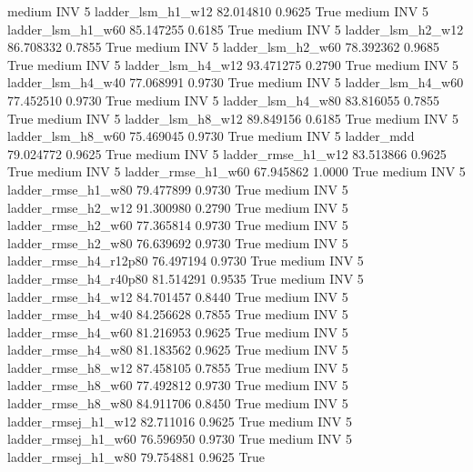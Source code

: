     medium      INV                 5      ladder_lsm_h1_w12  82.014810      0.9625    True
    medium      INV                 5      ladder_lsm_h1_w60  85.147255      0.6185    True
    medium      INV                 5      ladder_lsm_h2_w12  86.708332      0.7855    True
    medium      INV                 5      ladder_lsm_h2_w60  78.392362      0.9685    True
    medium      INV                 5      ladder_lsm_h4_w12  93.471275      0.2790    True
    medium      INV                 5      ladder_lsm_h4_w40  77.068991      0.9730    True
    medium      INV                 5      ladder_lsm_h4_w60  77.452510      0.9730    True
    medium      INV                 5      ladder_lsm_h4_w80  83.816055      0.7855    True
    medium      INV                 5      ladder_lsm_h8_w12  89.849156      0.6185    True
    medium      INV                 5      ladder_lsm_h8_w60  75.469045      0.9730    True
    medium      INV                 5             ladder_mdd  79.024772      0.9625    True
    medium      INV                 5     ladder_rmse_h1_w12  83.513866      0.9625    True
    medium      INV                 5     ladder_rmse_h1_w60  67.945862      1.0000    True
    medium      INV                 5     ladder_rmse_h1_w80  79.477899      0.9730    True
    medium      INV                 5     ladder_rmse_h2_w12  91.300980      0.2790    True
    medium      INV                 5     ladder_rmse_h2_w60  77.365814      0.9730    True
    medium      INV                 5     ladder_rmse_h2_w80  76.639692      0.9730    True
    medium      INV                 5  ladder_rmse_h4_r12p80  76.497194      0.9730    True
    medium      INV                 5  ladder_rmse_h4_r40p80  81.514291      0.9535    True
    medium      INV                 5     ladder_rmse_h4_w12  84.701457      0.8440    True
    medium      INV                 5     ladder_rmse_h4_w40  84.256628      0.7855    True
    medium      INV                 5     ladder_rmse_h4_w60  81.216953      0.9625    True
    medium      INV                 5     ladder_rmse_h4_w80  81.183562      0.9625    True
    medium      INV                 5     ladder_rmse_h8_w12  87.458105      0.7855    True
    medium      INV                 5     ladder_rmse_h8_w60  77.492812      0.9730    True
    medium      INV                 5     ladder_rmse_h8_w80  84.911706      0.8450    True
    medium      INV                 5    ladder_rmsej_h1_w12  82.711016      0.9625    True
    medium      INV                 5    ladder_rmsej_h1_w60  76.596950      0.9730    True
    medium      INV                 5    ladder_rmsej_h1_w80  79.754881      0.9625    True
